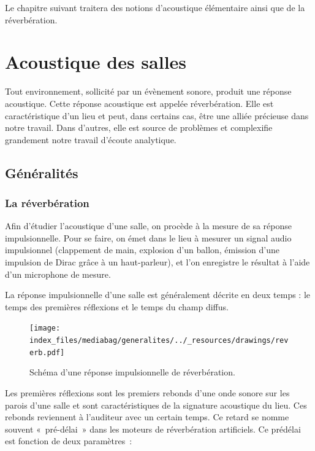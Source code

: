 \documentclass[
  letterpaper,
  DIV=11,
  numbers=noendperiod]{scrreprt}
\begin{document}
Le chapitre suivant traitera des notions d'acoustique élémentaire ainsi
que de la réverbération.

\hypertarget{acoustique-des-salles}{%
\chapter{Acoustique des salles}\label{acoustique-des-salles}}

Tout environnement, sollicité par un évènement sonore, produit une
réponse acoustique. Cette réponse acoustique est appelée réverbération.
Elle est caractéristique d'un lieu et peut, dans certains cas, être une
alliée précieuse dans notre travail. Dans d'autres, elle est source de
problèmes et complexifie grandement notre travail d'écoute analytique.

\hypertarget{guxe9nuxe9ralituxe9s-1}{%
\section{Généralités}\label{guxe9nuxe9ralituxe9s-1}}

\hypertarget{la-ruxe9verbuxe9ration}{%
\subsection{La réverbération}\label{la-ruxe9verbuxe9ration}}

Afin d'étudier l'acoustique d'une salle, on procède à la mesure de sa
réponse impulsionnelle. Pour se faire, on émet dans le lieu à mesurer un
signal audio impulsionnel (clappement de main, explosion d'un ballon,
émission d'une impulsion de Dirac grâce à un haut-parleur), et l'on
enregistre le résultat à l'aide d'un microphone de mesure.

La réponse impulsionnelle d'une salle est généralement décrite en deux
temps : le temps des premières réflexions et le temps du champ diffus.

\begin{figure}

{\centering \texttt{[image: index\_files/mediabag/generalites/../\_resources/drawings/reverb.pdf]}

}

\caption{\label{fig-impulse}Schéma d'une réponse impulsionnelle de
réverbération.}

\end{figure}

Les premières réflexions sont les premiers rebonds d'une onde sonore sur
les parois d'une salle et sont caractéristiques de la signature
acoustique du lieu. Ces rebonds reviennent à l'auditeur avec un certain
temps. Ce retard se nomme souvent «~pré-délai~» dans les moteurs de
réverbération artificiels. Ce prédélai est fonction de deux paramètres~:
\end{document}

